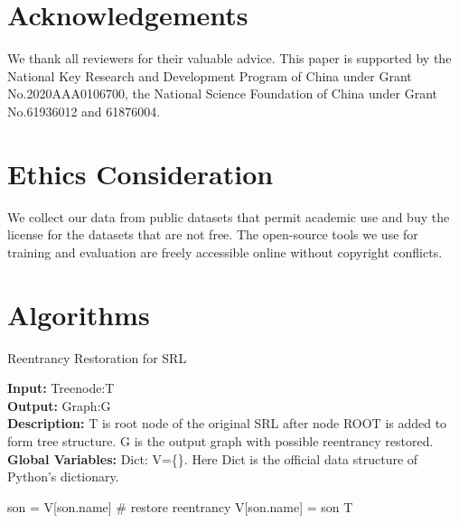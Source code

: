 \documentclass[11pt]{article}
\begin{document}
\section{Acknowledgements}
We thank all reviewers for their valuable advice. This paper is supported by the National Key Research and Development Program of China under Grant No.2020AAA0106700, the National Science Foundation of China under Grant No.61936012 and 61876004.

\section{Ethics Consideration}
We collect our data from public datasets that permit academic use and buy the license for the datasets that are not free. The open-source tools we use for training and evaluation are freely accessible online without copyright conflicts. 
 
\newpage




\clearpage
\appendix

\section{Algorithms}
\label{alg:reen}
\begin{algorithm}[htb]
\caption{Reentrancy Restoration for SRL} \hspace*{0.02in} {\bf Input:} Treenode:T\\
\hspace*{0.02in} {\bf Output:} Graph:G \\
\hspace*{0.02in} {\bf Description:} T is root node of the original SRL after node ROOT is added to form tree structure. G is the output graph with possible reentrancy restored.\\
\hspace*{0.02in} {\bf Global Variables:} Dict: V=\{\}. Here Dict is the official data structure of Python's dictionary.
\begin{algorithmic}[1]

            \State son = V[son.name] 
            \State\# restore reentrancy 
\Else
\State V[son.name] = son
\EndIf
\EndFor
\EndFor
\State \Return T
\end{algorithmic}
\end{algorithm}
\end{document}
